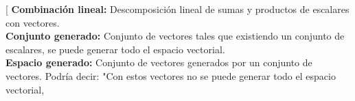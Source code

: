\begin{note}
[
    \textbf{Combinación lineal:} Descomposición lineal de sumas y productos de escalares con vectores. \\
    \textbf{Conjunto generado:} Conjunto de vectores tales que existiendo un conjunto de escalares, se puede generar todo el espacio vectorial. \\
    \textbf{Espacio generado:} Conjunto de vectores generados por un conjunto de vectores. Podría decir: "Con estos vectores no se puede generar todo el espacio vectorial, 
\end{note}